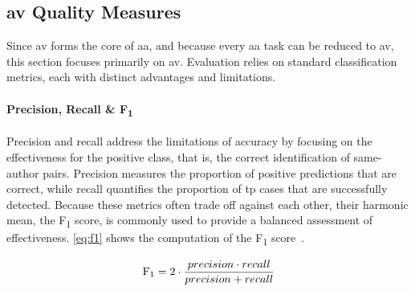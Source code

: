 \subsection{\acs{av} Quality Measures}
\label{subsec:av_quality_measures}

Since \ac{av} forms the core of \ac{aa}, and because every \ac{aa} task can be reduced to \ac{av}, this section focuses primarily on \ac{av}. 
Evaluation relies on standard classification metrics, each with distinct advantages and limitations.



\paragraph{Precision, Recall \& F\textsubscript{1}}
Precision and recall address the limitations of accuracy by focusing on the effectiveness for the positive class, that is, the correct identification of same-author pairs. 
Precision measures the proportion of positive predictions that are correct, while recall quantifies the proportion of \ac{tp} cases that are successfully detected. 
Because these metrics often trade off against each other, their harmonic mean, the F\textsubscript{1} score, is commonly used to provide a balanced assessment of effectiveness. 
\autoref{eq:f1} shows the computation of the F\textsubscript{1} score~\citep{neal_surveying_2018}.

\begin{equation}\label{eq:f1}
     \text{F\textsubscript{1}} = 2 \cdot \frac{precision \cdot recall}{precision + recall}
\end{equation}


